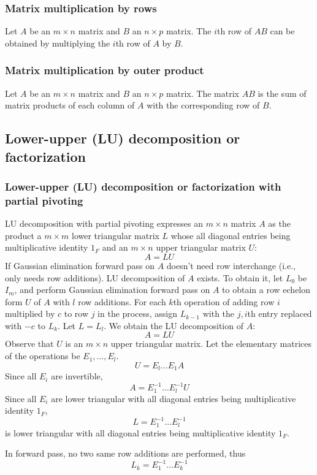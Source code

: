 \documentclass[a4paper,12pt]{report}
\begin{document}
\subsubsection{Matrix multiplication by rows}
Let $A$ be an $m\times n$ matrix and $B$ an $n\times p$ matrix. The $i$th row of $AB$ can be obtained by multiplying the $i$th row of $A$ by $B$.
\subsubsection{Matrix multiplication by outer product}
Let $A$ be an $m\times n$ matrix and $B$ an $n\times p$ matrix. The matrix $AB$ is the sum of matrix products of each column of $A$ with the corresponding row of $B$.
\subsection{Lower-upper (LU) decomposition or factorization}
\subsubsection{Lower-upper (LU) decomposition or factorization with partial pivoting}
LU decomposition with partial pivoting expresses an $m\times n$ matrix $A$ as the product a $m\times m$ lower triangular matrix $L$ whose all diagonal entries being multiplicative identity $1_F$ and an $m\times n$ upper triangular matrix $U$:
\[A=LU\]
If Gaussian elimination forward pass on $A$ doesn't need row interchange (i.e., only needs row additions). LU decomposition of $A$ exists. To obtain it, let $L_0$ be $I_m$, and perform Gaussian elimination forward pass on $A$ to obtain a row echelon form $U$ of $A$ with $l$ row additions. For each $k$th operation of adding row $i$ multiplied by $c$ to row $j$ in the process, assign $L_{k-1}$ with the $j,i$th entry replaced with $-c$ to $L_k$. Let $L=L_l$. We obtain the LU decomposition of $A$:
\[A=LU\]
\bpr
Observe that $U$ is an $m\times n$ upper triangular matrix. Let the elementary matrices of the operations be $E_1,\ldots,E_l$.
\[U=E_l\ldots E_1A\]
Since all $E_i$ are invertible,
\[A=E_1^{-1}\ldots E_l^{-1}U\]
Since all $E_i$ are lower triangular with all diagonal entries being multiplicative identity $1_F$,
\[L=E_1^{-1}\ldots E_l^{-1}\]
is lower triangular with all diagonal entries being multiplicative identity $1_F$.

In forward pass, no two same row additions are performed, thus
\[L_k=E_1^{-1}\ldots E_k^{-1}\]
\epr
\end{document}
